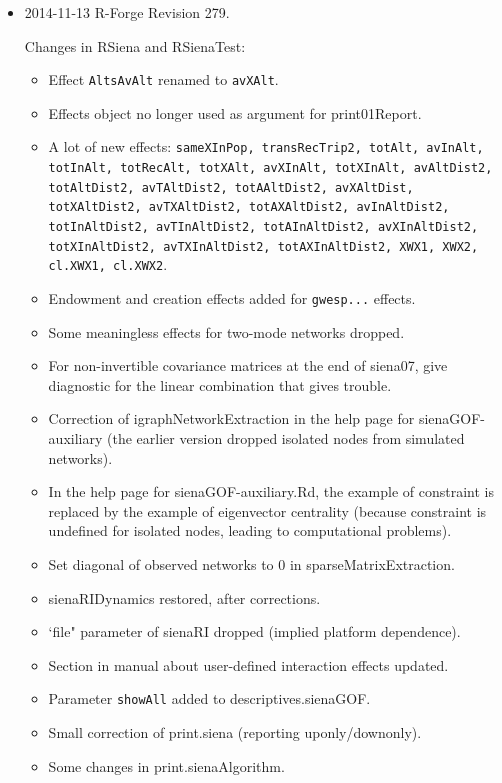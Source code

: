\documentclass[a4paper,fleqn,11pt]{article}
\newcommand{\+}{\, + \,}
\newcommand{\sfn}[1]{\textsf{#1}}
\begin{document}
\begin{small}
\begin{itemize}
\item 2014-11-13  R-Forge Revision 279.

Changes in \textsf{RSiena} and \textsf{RSienaTest}:
\begin{itemize}
   \item Effect \texttt{AltsAvAlt} renamed to \texttt{avXAlt}.
   \item Effects object no longer used as argument for \textsf{print01Report}.
   \item A lot of new effects: \texttt{sameXInPop, transRecTrip2, totAlt, avInAlt, totInAlt,
     totRecAlt, totXAlt, avXInAlt, totXInAlt,
	 avAltDist2, totAltDist2, avTAltDist2, totAAltDist2,
	 avXAltDist, totXAltDist2, avTXAltDist2, totAXAltDist2,
	 avInAltDist2, totInAltDist2, avTInAltDist2, totAInAltDist2,
	 avXInAltDist2, totXInAltDist2, avTXInAltDist2, totAXInAltDist2,
     XWX1, XWX2, cl.XWX1, cl.XWX2}.
   \item Endowment and creation effects added for \texttt{gwesp...} effects.
   \item Some meaningless effects for two-mode networks dropped.
   \item For non-invertible covariance matrices at the end of \textsf{siena07},
         give diagnostic for the linear combination that gives trouble.
   \item Correction of \sfn{igraphNetworkExtraction} in the help page
       for \sfn{sienaGOF-auxiliary}
     (the earlier version dropped isolated nodes from simulated networks).
   \item In the help page for \sfn{sienaGOF-auxiliary.Rd},
     the example of constraint is replaced
     by the example of eigenvector centrality (because constraint
	 is undefined for isolated nodes, leading to computational problems).
   \item Set diagonal of observed networks to 0 in \sfn{sparseMatrixExtraction}.
   \item \sfn{sienaRIDynamics} restored, after corrections.
   \item `file" parameter of \sfn{sienaRI} dropped (implied platform dependence).
   \item Section in manual about user-defined interaction effects updated.
   \item Parameter \texttt{showAll} added to \sfn{descriptives.sienaGOF}.
   \item Small correction of \sfn{print.siena} (reporting uponly/downonly).
   \item Some changes in \sfn{print.sienaAlgorithm}.

\end{itemize}
\end{itemize}
\end{small}
\end{document}
